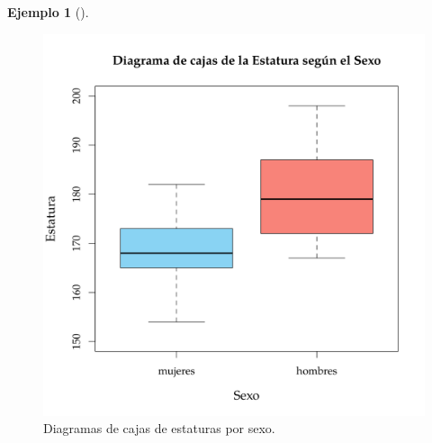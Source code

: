 \documentclass[
  a4paper,
]{scrreport}
\theoremstyle{definition}
\theoremstyle{definition}
\newtheorem{example}{Ejemplo}[chapter]
\theoremstyle{plain}
\theoremstyle{remark}
\begin{document}
\begin{example}[]
\begin{figure}
{\centering \includegraphics{./img/descriptiva/diagrama_caja_estatura_sexo.png}

}

\caption{Diagramas de cajas de estaturas por sexo.}

\end{figure}

\end{example}
\end{document}
